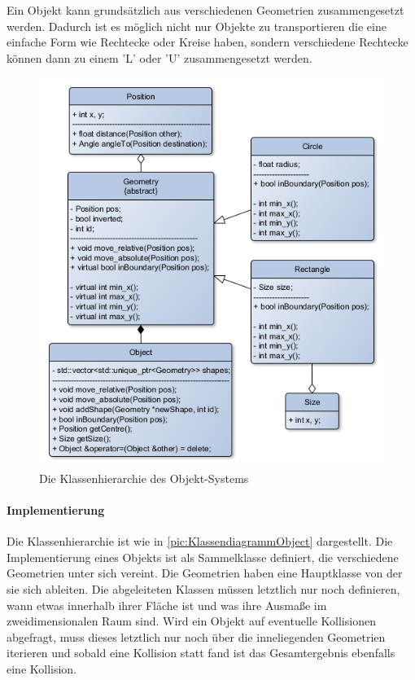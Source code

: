 Ein Objekt kann grundsätzlich aus verschiedenen Geometrien zusammengesetzt werden. Dadurch ist es möglich nicht nur Objekte zu transportieren die eine einfache Form wie Rechtecke oder Kreise haben, sondern verschiedene Rechtecke können dann zu einem 'L' oder 'U' zusammengesetzt werden.

\begin{figure}
	\includegraphics[width=\pictureWidth,keepaspectratio]{graphics/Klassendiagramme/KlassendiagrammObject.png}
	\caption{Die Klassenhierarchie des Objekt-Systems}
	\label{pic:KlassendiagrammObject}
\end{figure}

\paragraph*{Implementierung}
Die Klassenhierarchie ist wie in \autoref{pic:KlassendiagrammObject} dargestellt. Die Implementierung eines Objekts ist als Sammelklasse definiert, die verschiedene Geometrien unter sich vereint. Die Geometrien haben eine Hauptklasse von der sie sich ableiten. Die abgeleiteten Klassen müssen letztlich nur noch definieren, wann etwas innerhalb ihrer Fläche ist und was ihre Ausmaße im zweidimensionalen Raum sind. Wird ein Objekt auf eventuelle Kollisionen abgefragt, muss dieses letztlich nur noch über die inneliegenden Geometrien iterieren und sobald eine Kollision statt fand ist das Gesamtergebnis ebenfalls eine Kollision.

